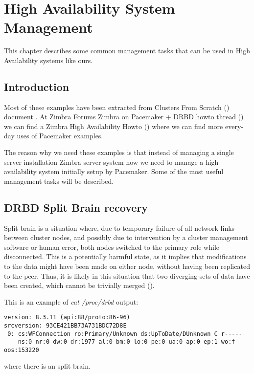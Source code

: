 

\chapter{High Availability System Management}
\label{chap:ha-system-management}
This chapter describes some common management tasks that can be used in High Availability systems like ours.

\section {Introduction}
Most of these examples have been extracted from Clusters From Scratch (\cite{ClustersFromScratch}) document . At Zimbra Forums Zimbra on Pacemaker + DRBD howto thread (\cite{ZForumsTaer}) we can find a Zimbra High Availability Howto (\cite{TaerHowtoHAZimbra8}) where we can find more every-day uses of Pacemaker examples.

The reason why we need these examples is that instead of managing a single server installation Zimbra server system now we need to manage a high availability system initially setup by Pacemaker. Some of the most useful management tasks will be described.

\section {DRBD Split Brain recovery}

Split brain is a situation where, due to temporary failure of all network links between cluster nodes, and possibly due to intervention by a cluster management software or human error, both nodes switched to the primary role while disconnected. This is a potentially harmful state, as it implies that modifications to the data might have been made on either node, without having been replicated to the peer. Thus, it is likely in this situation that two diverging sets of data have been created, which cannot be trivially merged (\cite{DrbdSplitBrain}).

This is an example of \textit{cat /proc/drbd} output:
\begin{verbatim}
version: 8.3.11 (api:88/proto:86-96)
srcversion: 93CE421BB73A731BDC72D8E 
 0: cs:WFConnection ro:Primary/Unknown ds:UpToDate/DUnknown C r-----
    ns:0 nr:0 dw:0 dr:1977 al:0 bm:0 lo:0 pe:0 ua:0 ap:0 ep:1 wo:f oos:153220
\end{verbatim}
where there is an split brain.

